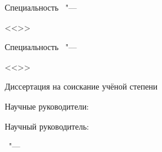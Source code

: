 \begin{center}
\textbf {\large %
\thesisTitle}

\vspace{0pt plus2fill} %
{%
Специальность \thesisSpecialtyNumber\ "---

<<\thesisSpecialtyTitle>>
}

\ifdefined\thesisSpecialtyTwoNumber
{%
Специальность \thesisSpecialtyTwoNumber\ "---

<<\thesisSpecialtyTwoTitle>>
}
\fi

\vspace{0pt plus2fill} %
Диссертация на соискание учёной степени

\thesisDegree
\end{center}
%
\vspace{0pt plus4fill} %
\begin{flushright}
\ifdefined\supervisorTwoFio
Научные руководители:

\supervisorRegalia

\ifdefined\supervisorDead
\framebox{\supervisorFio}
\else
\supervisorFio
\fi

\supervisorTwoRegalia

\ifdefined\supervisorTwoDead
\framebox{\supervisorTwoFio}
\else
\supervisorTwoFio
\fi
\else
Научный руководитель:

\supervisorRegalia

\ifdefined\supervisorDead
\framebox{\supervisorFio}
\else
\supervisorFio
\fi
\fi

\end{flushright}
%
\vspace{0pt plus4fill} %
{\centering\thesisCity\ "--- \thesisYear\par}
